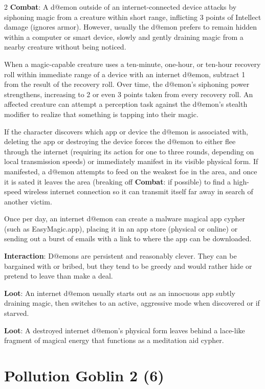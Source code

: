 \begin{multicols}{2}
\textbf{Combat}: A d@emon outside of an internet-connected device attacks by siphoning magic from a creature within short range, inflicting 3 points of Intellect damage (ignores armor). However, usually the d@emon prefers to remain hidden within a computer or smart device, slowly and gently draining magic from a nearby creature without being noticed. 

When a magic-capable creature uses a ten-minute, one-hour, or ten-hour recovery roll within immediate range of a device with an internet d@emon, subtract 1 from the result of the recovery roll. Over time, the d@emon’s siphoning power strengthens, increasing to 2 or even 3 points taken from every recovery roll. An affected creature can attempt a perception task against the d@emon’s stealth modifier to realize that something is tapping into their magic. 

If the character discovers which app or device the d@emon is associated with, deleting the app or destroying the device forces the d@emon to either flee through the internet (requiring its action for one to three rounds, depending on local transmission speeds) or immediately manifest in its visible physical form. If manifested, a d@emon attempts to feed on the weakest foe in the area, and once it is sated it leaves the area (breaking off \textbf{Combat}: if possible) to find a high-speed wireless internet connection so it can transmit itself far away in search of another victim. 

Once per day, an internet d@emon can create a malware magical app cypher (such as EasyMagic.app), placing it in an app store (physical or online) or sending out a burst of emails with a link to where the app can be downloaded. 

\textbf{Interaction}: D@emons are persistent and reasonably clever. They can be bargained with or bribed, but they tend to be greedy and would rather hide or pretend to leave than make a deal. 

\textbf{Loot}: An internet d@emon usually starts out as an innocuous app subtly draining magic, then switches to an active, aggressive mode when discovered or if starved. 

\textbf{Loot}: A destroyed internet d@emon’s physical form leaves behind a lace-like fragment of magical energy that functions as a meditation aid cypher.

\section{Pollution Goblin 2 (6)}


\end{multicols}
